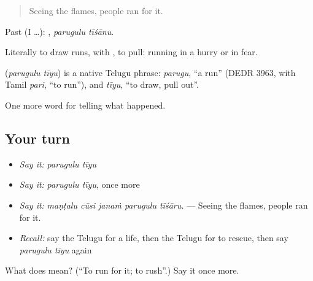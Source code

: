 \begin{quote}
Seeing the flames, people ran for it.
\end{quote}

Past (I …):  , \emph{parugulu tīśānu}.

Literally to draw runs, with , to pull: running in a hurry or in fear.

\begin{cousinweb}
\textbf{ } (\emph{parugulu tīyu}) is a native Telugu phrase: \emph{parugu}, \textquotedblleft{}a run\textquotedblright{} (DEDR 3963, with Tamil \emph{pari}, \textquotedblleft{}to run\textquotedblright{}), and \emph{tīyu}, \textquotedblleft{}to draw, pull out\textquotedblright{}.
\end{cousinweb}

\begin{grammarlens}[title={What you've built}]
One more word for telling what happened.
\end{grammarlens}

\subsection*{Your turn}
\begin{itemize}
\raggedright
  \item \emph{Say it:} \emph{parugulu tīyu}
  \item \emph{Say it:} \emph{parugulu tīyu}, once more
  \item \emph{Say it:} \emph{maṇṭalu cūsi janaṁ parugulu tīśāru.} — Seeing the flames, people ran for it.
  \item \emph{Recall:} say the Telugu for a life, then the Telugu for to rescue, then say \emph{parugulu tīyu} again
\end{itemize}

\begin{tcolorbox}[breakable,colback=teal!4,colframe=teal!35!black,title={Before you move on}]
What does   mean? (\textquotedblleft{}To run for it; to rush\textquotedblright{}.) Say it once more.
\end{tcolorbox}
